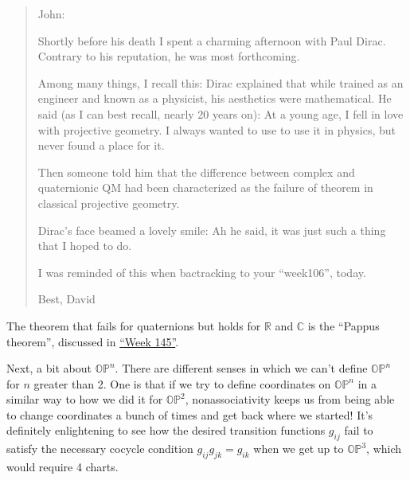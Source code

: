 \documentclass{article}
\begin{document}
\begin{quote}
John:

Shortly before his death I spent a charming afternoon with Paul Dirac.
Contrary to his reputation, he was most forthcoming.

Among many things, I recall this: Dirac explained that while trained as
an engineer and known as a physicist, his aesthetics were mathematical.
He said (as I can best recall, nearly 20 years on): At a young age, I
fell in love with projective geometry. I always wanted to use to use it
in physics, but never found a place for it.

Then someone told him that the difference between complex and
quaternionic QM had been characterized as the failure of theorem in
classical projective geometry.

Dirac's face beamed a lovely smile: Ah he said, it was just such a thing
that I hoped to do.

I was reminded of this when bactracking to your ``week106'', today.

Best, David
\end{quote}

The theorem that fails for quaternions but holds for \(\mathbb{R}\) and
\(\mathbb{C}\) is the ``Pappus theorem'', discussed in
\protect\hyperlink{week145}{``Week 145''}.

Next, a bit about \(\mathbb{OP}^n\). There are different senses in which
we can't define \(\mathbb{OP}^n\) for \(n\) greater than 2. One is that
if we try to define coordinates on \(\mathbb{OP}^n\) in a similar way to
how we did it for \(\mathbb{OP}^2\), nonassociativity keeps us from
being able to change coordinates a bunch of times and get back where we
started! It's definitely enlightening to see how the desired transition
functions \(g_{ij}\) fail to satisfy the necessary cocycle condition
\(g_{ij} g_{jk} = g_{ik}\) when we get up to \(\mathbb{OP}^3\), which
would require 4 charts.
\end{document}
